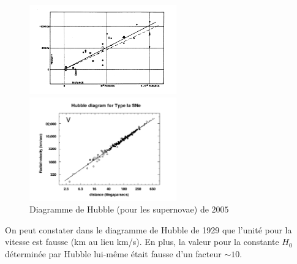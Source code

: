 \documentclass[a4paper,12pt]{report}
\theoremstyle{plain}
\theoremstyle{plain}
\begin{document}
      	 \begin{figure}[h]
\begin{center}
	\begin{minipage}{14pc}
\includegraphics[width=15pc]{t3.png}
\caption{Diagramme publi\'e par Edwin
Hubble dans son article de $1929$ \cite{1}}
\end{minipage}\hspace{3pc}%
\begin{minipage}{14pc}
\includegraphics[width=15pc]{t4.png}
 \caption{Diagramme de Hubble (pour
les supernovae) de $2005$ \cite{2}}
 \end{minipage}\hspace{3pc}%
\end{center}
\end{figure}
      	
      	
      	On peut constater dans le diagramme de Hubble de 1929 que l'unit\'e pour la vitesse est fausse (km au lieu km/s). En plus, la valeur pour la constante $H_0$ d\'etermin\'ee par Hubble lui-m\^{e}me \'etait fausse d'un facteur $\sim 10$.
      	
\end{document}
